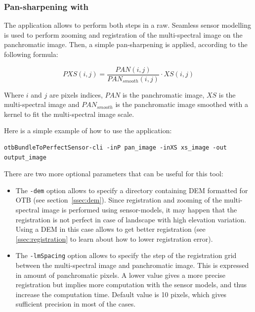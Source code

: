 \subsubsection{Pan-sharpening with \app}

The  application allows to
perform both steps in a raw. Seamless sensor modelling is used to
perform zooming and registration of the multi-spectral image on the
panchromatic image. Then, a simple pan-sharpening is applied,
according to the following formula:

\begin{equation}
PXS(i,j) = \frac{PAN(i,j)}{PAN_{smooth}(i,j)} \cdot XS(i,j)
\end{equation}

Where $i$ and $j$ are pixels indices, $PAN$ is the panchromatic image,
$XS$ is the multi-spectral image and $PAN_{smooth}$ is the
panchromatic image smoothed with a kernel to fit the multi-spectral
image scale.

Here is a simple example of how to use the
 application:

\begin{verbatim}
otbBundleToPerfectSensor-cli -inP pan_image -inXS xs_image -out output_image
\end{verbatim}

There are two more optional parameters that can be useful for this
tool:
\begin{itemize}
\item The \verb?-dem? option allows to specify a directory containing DEM
  formatted for OTB (see section~\ref{ssec:dem}). Since registration
  and zooming of the multi-spectral image is performed using
  sensor-models, it may happen that the registration is not perfect in
  case of landscape with high elevation variation. Using a DEM in this
  case allows to get better registration (see \ref{ssec:registration}
  to learn about how to lower registration error).
\item The \verb?-lmSpacing? option allows to specify the step of the
  registration grid between the multi-spectral image and panchromatic
  image. This is expressed in amount of panchromatic pixels. A lower
  value gives a more precise registration but implies more computation
  with the sensor models, and thus increase the computation
  time. Default value is 10 pixels, which gives sufficient precision
  in most of the cases.
\end{itemize}

